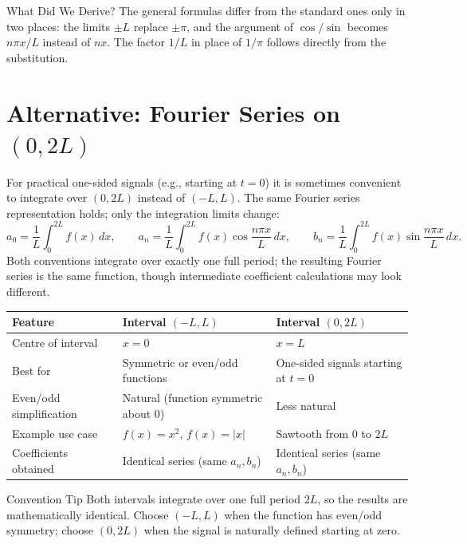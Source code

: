 \documentclass[12pt,a4paper]{article}
\begin{document}
\begin{learnbox}{What Did We Derive?}
The general formulas differ from the standard ones only in two places: the limits $\pm L$ replace $\pm\pi$, and the argument of $\cos/\sin$ becomes $n\pi x/L$ instead of $nx$.
The factor $1/L$ in place of $1/\pi$ follows directly from the substitution.
\end{learnbox}

\section{Alternative: Fourier Series on $(0, 2L)$}

For practical one-sided signals (e.g., starting at $t = 0$) it is sometimes convenient to integrate over $(0, 2L)$ instead of $(-L, L)$.
The same Fourier series representation holds; only the integration limits change:
\[
a_0 = \frac{1}{L}\int_{0}^{2L}f(x)\,dx, \qquad
a_n = \frac{1}{L}\int_{0}^{2L}f(x)\cos\frac{n\pi x}{L}\,dx, \qquad
b_n = \frac{1}{L}\int_{0}^{2L}f(x)\sin\frac{n\pi x}{L}\,dx.
\]
Both conventions integrate over exactly one full period; the resulting Fourier series is the same function, though intermediate coefficient calculations may look different.

\begin{center}
\begin{tabular}{lll}
\toprule
Feature & Interval $(-L,L)$ & Interval $(0,2L)$ \\
\midrule
Centre of interval & $x = 0$ & $x = L$ \\
Best for & Symmetric or even/odd functions & One-sided signals starting at $t=0$ \\
Even/odd simplification & Natural (function symmetric about 0) & Less natural \\
Example use case & $f(x) = x^2$, $f(x) = |x|$ & Sawtooth from $0$ to $2L$ \\
Coefficients obtained & Identical series (same $a_n, b_n$) & Identical series (same $a_n, b_n$) \\
\bottomrule
\end{tabular}
\end{center}

\begin{learnbox}{Convention Tip}
Both intervals integrate over one full period $2L$, so the results are mathematically identical.
Choose $(-L,L)$ when the function has even/odd symmetry; choose $(0,2L)$ when the signal is naturally defined starting at zero.
\end{learnbox}
\end{document}
